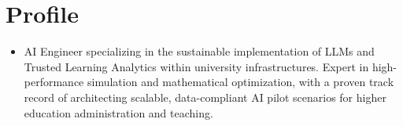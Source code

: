 \documentclass[A4,11pt]{article}
\newcommand{\CVSubHeadingListStart}{\begin{itemize}[leftmargin=0.5cm, label={}]}
\begin{document}

\section*{Profile}
\begin{itemize}
    \item AI Engineer specializing in the sustainable implementation of LLMs and Trusted Learning Analytics within university infrastructures. Expert in high-performance simulation and mathematical optimization, with a proven track record of architecting scalable, data-compliant AI pilot scenarios for higher education administration and teaching.
    

\end{itemize}

  
\end{document}
